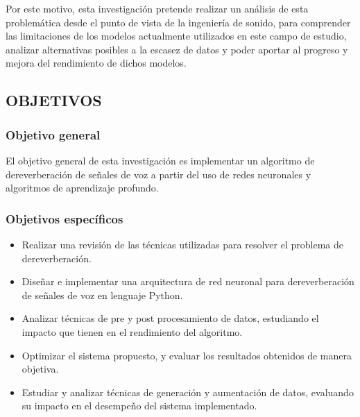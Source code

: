 Por este motivo, esta investigación pretende realizar un análisis de esta problemática desde el punto de vista de la ingeniería de sonido, para comprender las limitaciones de los modelos actualmente utilizados en este campo de estudio, analizar alternativas posibles a la escasez de datos y poder aportar al progreso y mejora del rendimiento de dichos modelos. 

\subsection[Objetivos]{OBJETIVOS}
\subsubsection{Objetivo general}

El objetivo general de esta investigación es implementar un algoritmo de dereverberación de señales de voz a partir del uso de redes neuronales y algoritmos de aprendizaje profundo. 

\subsubsection{Objetivos específicos}

\begin{itemize}
    \item Realizar una revisión de las técnicas utilizadas para resolver el problema de dereverberación.
    \item Diseñar e implementar una arquitectura de red neuronal para dereverberación de señales de voz en lenguaje Python.
    \item Analizar técnicas de pre y post procesamiento de datos, estudiando el impacto que tienen en el rendimiento del algoritmo.
    \item Optimizar el sistema propuesto, y evaluar los resultados obtenidos de manera objetiva.
    \item Estudiar y analizar técnicas de generación y aumentación de datos, evaluando su impacto en el desempeño del sistema implementado. 
\end{itemize}

